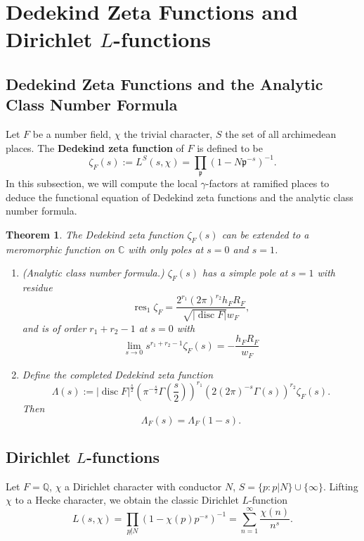\documentclass{article}
\newtheorem{theorem}{Theorem}
\theoremstyle{definition}
\theoremstyle{remark}
\newcommand{\C}{\mathbb{C}}
\newcommand{\Q}{\mathbb{Q}}
\newcommand{\frp}{\mathfrak{p}}
\DeclareMathOperator{\disc}{disc}
\DeclareMathOperator{\res}{res}
\begin{document}
\section{Dedekind Zeta Functions and Dirichlet $L$-functions}

\subsection{Dedekind Zeta Functions and the Analytic Class Number Formula}
Let $F$ be a number field, $\chi$ the trivial character, $S$ the set of all archimedean places.
The \textbf{Dedekind zeta function} of $F$ is defined to be \[\zeta_F(s) := L^S(s, \chi) = \prod_{\frp} (1-N\frp^{-s})^{-1}.\]
In this subsection, we will compute the local $\gamma$-factors at ramified places to deduce the functional equation of Dedekind zeta functions and the analytic class number formula.

\begin{theorem}
    The Dedekind zeta function $\zeta_F(s)$ can be extended to a meromorphic function on $\C$ with only poles at $s = 0$ and $s = 1$.
    \begin{enumerate}
        \item (Analytic class number formula.) $\zeta_F(s)$ has a simple pole at $s = 1$ with residue \[\res_{1}\zeta_F = \frac{2^{r_1}(2\pi)^{r_2}h_FR_F}{\sqrt{|\disc F|}w_F},\]
        and is of order $r_1+r_2-1$ at $s = 0$ with \[\lim_{s\to 0}s^{r_1+r_2-1}\zeta_F(s) = -\frac{h_FR_F}{w_F}\]
        \item Define the completed Dedekind zeta function \[\Lambda(s) := |\disc F|^{\frac{s}{2}}\left( \pi^{-\frac{s}{2}}\Gamma\left( \frac{s}{2} \right) \right)^{r_1}\left( 2(2\pi)^{-s}\Gamma(s) \right)^{r_2}\zeta_F(s).\]
        Then \[\Lambda_F(s) = \Lambda_F(1-s).\]
    \end{enumerate}
\end{theorem}




\subsection{Dirichlet $L$-functions}
Let $F = \Q$, $\chi$ a Dirichlet character with conductor $N$, $S = \{p:p|N\}\cup\{\infty\}$.
Lifting $\chi$ to a Hecke character, we obtain the classic Dirichlet $L$-function \[L(s, \chi) = \prod_{p\not| N}(1-\chi(p)p^{-s})^{-1} = \sum_{n=1}^\infty \frac{\chi(n)}{n^s}.\]
\end{document}
